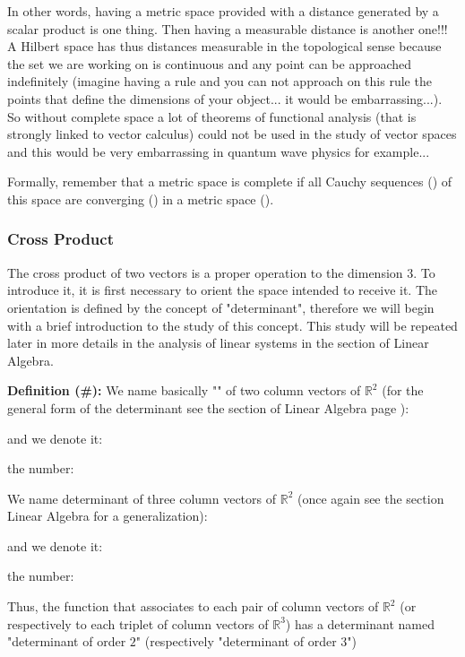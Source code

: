 	In other words, having a metric space provided with a distance generated by a scalar product is one thing. Then having a measurable distance is another one!!! A Hilbert space has thus distances measurable in the topological sense because the set we are working on is continuous and any point can be approached indefinitely (imagine having a rule and you can not approach on this rule the points that define the dimensions of your object... it would be embarrassing...). So without complete space a lot of theorems of functional analysis (that is strongly linked to vector calculus) could not be used in the study of vector spaces and this would be very embarrassing in quantum wave physics for example...
	
	Formally, remember that a metric space is complete if all Cauchy sequences () of this space are converging () in a metric space ().
	
	\subsubsection{Cross Product}
	The cross product of two vectors is a proper operation to the dimension $3$. To introduce it, it is first necessary to orient the space intended to receive it. The orientation is defined by the concept of "determinant", therefore we will begin with a brief introduction to the study of this concept. This study will be repeated later in more details in the analysis of linear systems in the section of Linear Algebra.
	
	\textbf{Definition (\#\mydef):} We name basically "" of two column vectors of $\mathbb{R}^2$ (for the general form of the determinant see the section of Linear Algebra page \pageref{determinant}):
	
	and we denote it:
	
	the number:
	
	We name determinant of three column vectors of $\mathbb{R}^2$ (once again see the section Linear Algebra for a generalization):
	
	and we denote it:
	
	the number:
	
	Thus, the function that associates to each pair of column vectors of $\mathbb{R}^2$ (or respectively to each triplet of column vectors of $\mathbb{R}^3$) has a determinant named "determinant of order $2$" (respectively "determinant of order $3$")
	

